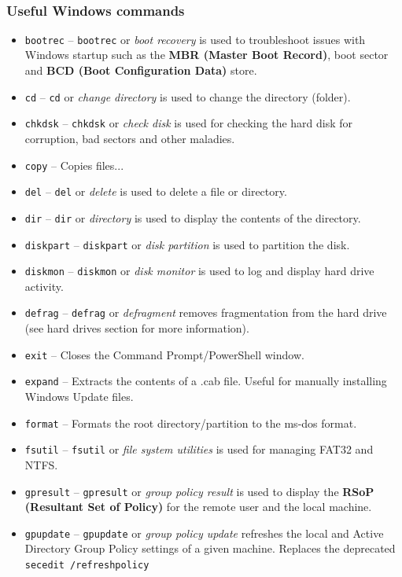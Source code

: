 \documentclass{article}
\begin{document}
\

\subsubsection{Useful Windows commands}

\begin{itemize}    
\item \texttt{bootrec} -- \texttt{bootrec} or \textit{boot recovery} is used to troubleshoot issues with Windows startup such as the \textbf{MBR (Master Boot Record)}, boot sector and \textbf{BCD (Boot Configuration Data)} store.
\item \texttt{cd} -- \texttt{cd} or \textit{change directory} is used to change the directory (folder).
\item \texttt{chkdsk} -- \texttt{chkdsk} or \textit{check disk} is used for checking the hard disk for corruption, bad sectors and other maladies.
\item \texttt{copy} -- Copies files...
\item \texttt{del} -- \texttt{del} or \textit{delete} is used to delete a file or directory.
\item \texttt{dir} -- \texttt{dir} or \textit{directory} is used to display the contents of the directory.
\item \texttt{diskpart} -- \texttt{diskpart} or \textit{disk partition} is used to partition the disk.
\item \texttt{diskmon} -- \texttt{diskmon} or \textit{disk monitor} is used to log and display hard drive activity.
\item \texttt{defrag} -- \texttt{defrag} or \textit{defragment} removes fragmentation from the hard drive (see hard drives section for more information).
\item \texttt{exit} -- Closes the Command Prompt/PowerShell window.
\item \texttt{expand} -- Extracts the contents of a .cab file. Useful for manually installing Windows Update files.
\item \texttt{format} -- Formats the root directory/partition to the ms-dos format.
\item \texttt{fsutil} -- \texttt{fsutil} or \textit{file system utilities} is used for managing FAT32 and NTFS.
\item \texttt{gpresult} -- \texttt{gpresult} or \textit{group policy result} is used to display the \textbf{RSoP (Resultant Set of Policy)} for the remote user and the local machine.
\item \texttt{gpupdate} -- \texttt{gpupdate} or \textit{group policy update} refreshes the local and Active Directory Group Policy settings of a given machine. Replaces the deprecated \texttt{secedit /refreshpolicy}

\end{itemize}
\end{document}
